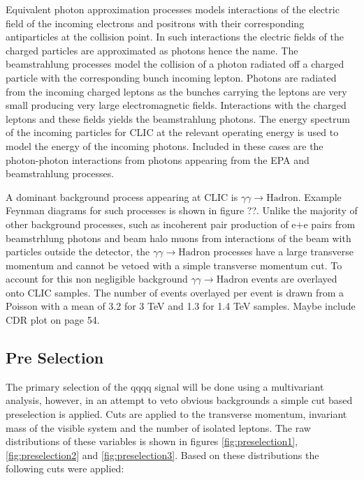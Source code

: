 Equivalent photon approximation processes models interactions of the electric field of the incoming electrons and positrons with their corresponding antiparticles at the collision point. In such interactions the electric fields of the charged particles are approximated as photons hence the name. The beamstrahlung processes model the collision of a photon radiated off a charged particle with the corresponding bunch incoming lepton. Photons are radiated from the incoming charged leptons as the bunches carrying the leptons are very small producing very large electromagnetic fields. Interactions with the charged leptons and these fields yields the beamstrahlung photons. The energy spectrum of the incoming particles for CLIC at the relevant operating energy is used to model the energy of the incoming photons. Included in these cases are the photon-photon interactions from photons appearing from the EPA and beamstrahlung processes.

A dominant background process appearing at CLIC is $\gamma\gamma \rightarrow \text{Hadron}$. Example Feynman diagrams for such processes is shown in figure ??. Unlike the majority of other background processes, such as incoherent pair production of e+e  pairs from beamstrhlung photons and beam halo muons from interactions of the beam with particles outside the detector, the $\gamma\gamma \rightarrow \text{Hadron}$ processes have a large transverse momentum and cannot be vetoed with a simple transverse momentum cut. To account for this non negligible background $\gamma\gamma \rightarrow \text{Hadron}$ events are overlayed onto CLIC samples. The number of events overlayed per event is drawn from a Poisson with a mean of 3.2 for 3 TeV and 1.3 for 1.4 TeV samples. Maybe include CDR plot on page 54.

\subsection{Pre Selection}

The primary selection of the \nu{\nu}qqqq signal will be done using a multivariant analysis, however, in an attempt to veto obvious backgrounds a simple cut based preselection is applied. Cuts are applied to the transverse momentum, invariant mass of the visible system and the number of isolated leptons. The raw distributions of these variables is
shown in figures \ref{fig:preselection1}, \ref{fig:preselection2} and \ref{fig:preselection3}. Based on these distributions the following cuts were applied:

